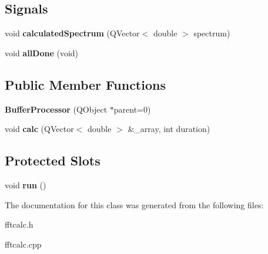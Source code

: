 \subsection*{Signals}
\begin{DoxyCompactItemize}
\item 
\hypertarget{class_buffer_processor_a466db3cca5282cd8b1d8c2ad6289ba35}{void {\bfseries calculated\-Spectrum} (Q\-Vector$<$ double $>$ spectrum)}\label{class_buffer_processor_a466db3cca5282cd8b1d8c2ad6289ba35}

\item 
\hypertarget{class_buffer_processor_a9dd9e6636e0dc2a4a263f045a3338013}{void {\bfseries all\-Done} (void)}\label{class_buffer_processor_a9dd9e6636e0dc2a4a263f045a3338013}

\end{DoxyCompactItemize}
\subsection*{Public Member Functions}
\begin{DoxyCompactItemize}
\item 
\hypertarget{class_buffer_processor_a910d84b159f28bcaf05b47ce7e81eb0c}{{\bfseries Buffer\-Processor} (Q\-Object $\ast$parent=0)}\label{class_buffer_processor_a910d84b159f28bcaf05b47ce7e81eb0c}

\item 
\hypertarget{class_buffer_processor_af90a936a161872a0a4d4406af2822db9}{void {\bfseries calc} (Q\-Vector$<$ double $>$ \&\-\_\-array, int duration)}\label{class_buffer_processor_af90a936a161872a0a4d4406af2822db9}

\end{DoxyCompactItemize}
\subsection*{Protected Slots}
\begin{DoxyCompactItemize}
\item 
\hypertarget{class_buffer_processor_a6faf10ab214287a399d05fce676dca6e}{void {\bfseries run} ()}\label{class_buffer_processor_a6faf10ab214287a399d05fce676dca6e}

\end{DoxyCompactItemize}


The documentation for this class was generated from the following files\-:\begin{DoxyCompactItemize}
\item 
fftcalc.\-h\item 
fftcalc.\-cpp\end{DoxyCompactItemize}
